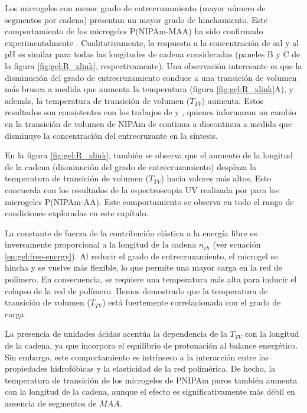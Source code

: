 Los microgeles con menor grado de entrecruzamiento (mayor n\'umero de segmentos por cadena) presentan un mayor grado de hinchamiento. Este comportamiento de los microgeles P(NIPAm-MAA) ha sido confirmado experimentalmente \cite{khan2013preparation}. Cualitativamente, la respuesta a la concentraci\'on de sal y al pH es similar para todas las longitudes de cadena consideradas (paneles B y C de la figura \ref{fig:gel:R_xlink}, respectivamente). Una observaci\'on interesante es que la disminuci\'on del grado de entrecruzamiento conduce a una transici\'on de volumen m\'as brusca a medida que aumenta la temperatura (figura \ref{fig:gel:R_xlink}A), y adem\'as, la temperatura de transici\'on de volumen ($T_{TV}$) aumenta. Estos resultados son consistentes con los trabajos de \citet{li1989study} y \citet{wu1997volume}, quienes informaron un cambio en la transici\'on de volumen de NIPAm de continua a discontinua a medida que disminuye la concentraci\'on del entrecruzante en la s\'intesis.

En la figura \ref{fig:gel:R_xlink}, tambi\'en se observa que el aumento de la longitud de la cadena (disminuci\'on del grado de entrecruzamiento) desplaza la temperatura de transici\'on de volumen ($T_{TV}$) hacia valores m\'as altos. Esto concuerda con los resultados de la espectroscopia UV realizada por \citet{Lee2008} para los microgeles P(NIPAm-AA). Este comportamiento se observa en todo el rango de condiciones exploradas en este cap\'itulo.

La constante de fuerza de la contribuci\'on el\'astica a la energ\'ia libre es inversamente proporcional a la longitud de la cadena $n_{ch}$ (ver ecuaci\'on \ref{eq:gel:free-energy}). Al reducir el grado de entrecruzamiento, el microgel se hincha y se vuelve m\'as flexible, lo que permite una mayor carga en la red de pol\'imero. En consecuencia, se requiere una temperatura m\'as alta para inducir el colapso de la red de pol\'imero. Hemos demostrado que la temperatura de transici\'on de volumen ($T_{TV}$) est\'a fuertemente correlacionada con el grado de carga.

La presencia de unidades \'acidas acent\'ua la dependencia de la $T_{TV}$ con la longitud de la cadena, ya que incorpora el equilibrio de protonaci\'on al balance energ\'etico. Sin embargo, este comportamiento es intr\'inseco a la interacci\'on entre las propiedades hidrof\'obicas y la elasticidad de la red polim\'erica. De hecho, la temperatura de transici\'on de los microgeles de PNIPAm puros tambi\'en aumenta con la longitud de la cadena, aunque el efecto es significativamente m\'as d\'ebil en ausencia de segmentos de $MAA$.




